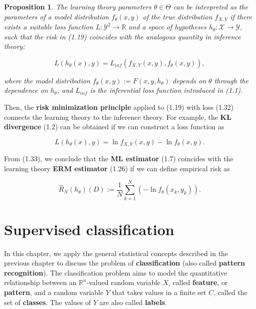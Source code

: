 \documentclass{report}
\newtheorem{proposition}{Proposition}[chapter]
\begin{document}
\begin{proposition}
The learning theory parameters $\theta \in \Theta$ can be interpreted as the parameters of a model distribution $f_\theta(x,y)$ of the true distribution $f_{X,Y}$ if there exists a suitable loss function $L : \mathcal{Y}^2 \to \mathbb{R}$ and a space of hypotheses $h_\theta: \mathcal{X} \to \mathcal{Y}$, such that the risk in (1.19) coincides with the analogous quantity in inference theory:

\begin{equation}
L(h_\theta(x), y) = L_{inf}(f_{X,Y}(x,y),f_\theta(x,y)),
\end{equation}

where the model distribution $f_\theta(x,y) := F(x,y,h_\theta)$ depends on $\theta$ through the dependence on $h_\theta$, and $L_{inf}$ is the inferential loss function introduced in (1.1).
\end{proposition}

Then, the \textbf{risk minimization principle} applied to (1.19) with loss (1.32) connects the learning theory to the inference theory. For example, the \textbf{KL divergence} (1.2) can be obtained if we can construct a loss function as

\begin{equation}
L(h_\theta(x), y) = \ln f_{X,Y}(x,y) -\ln f_\theta(x,y).
\end{equation}

From (1.33), we conclude that the \textbf{ML estimator} (1.7) coincides with the learning theory \textbf{ERM estimator} (1.26) if we can define empirical risk as

\begin{equation}
\hat{R}_N(h_\theta)(D) := \frac{1}{N}\sum_{k=1}^N (-\ln f_\theta(x_k,y_k)).
\end{equation}

\chapter{Supervised classification}
In this chapter, we apply the general statistical concepts described in the previous chapter to discuss the problem of \textbf{classification} (also called \textbf{pattern recognition}). The classification problem aims to model the quantitative relationship between an $\mathbb{R}^n$-valued random variable $X$, called \textbf{feature}, or \textbf{pattern}, and a random variable $Y$ that takes values in a finite set $C$, called the set of \textbf{classes}. The values of $Y$ are also called \textbf{labels}.
\end{document}
